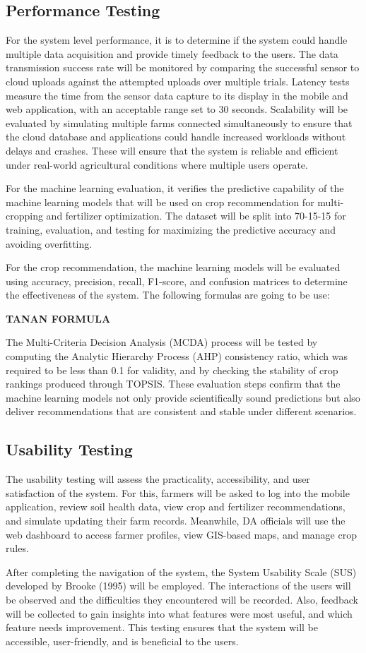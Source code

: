 {	\subsection{Performance Testing}
	For the system level performance, it is to determine if the system could handle multiple data acquisition and provide timely feedback to the users. The data transmission success rate will be monitored by comparing the successful sensor to cloud uploads against the attempted uploads over multiple trials. Latency tests measure the time from the sensor data capture to its display in the mobile and web application, with an acceptable range set to 30 seconds. Scalability will be evaluated by simulating multiple farms connected simultaneously to ensure that the cloud database and applications could handle increased workloads without delays and crashes. These will ensure that the system is reliable and efficient under real-world agricultural conditions where multiple users operate.
	
	For the machine learning evaluation, it verifies the predictive capability of the machine learning models that will be used on crop recommendation for multi-cropping and fertilizer optimization. The dataset will be split into 70-15-15 for training, evaluation, and testing for maximizing the predictive accuracy and avoiding overfitting. 
	
	For the crop recommendation, the machine learning models will be evaluated using accuracy, precision, recall, F1-score, and confusion matrices to determine the effectiveness of the system. The following formulas are going to be use:
	
	\textbf{TANAN FORMULA}
	
	The Multi-Criteria Decision Analysis (MCDA) process will be tested by computing the Analytic Hierarchy Process (AHP) consistency ratio, which was required to be less than 0.1 for validity, and by checking the stability of crop rankings produced through TOPSIS. These evaluation steps confirm that the machine learning models not only provide scientifically sound predictions but also deliver recommendations that are consistent and stable under different scenarios.
	
	\subsection{Usability Testing}
	The usability testing will assess the practicality, accessibility, and user satisfaction of the system. For this, farmers will be asked to log into the mobile application, review soil health data, view crop and fertilizer recommendations, and simulate updating their farm records. Meanwhile, DA officials will use the web dashboard to access farmer profiles, view GIS-based maps, and manage crop rules.
	
	After completing the navigation of the system, the System Usability Scale (SUS) developed by Brooke (1995) will be employed. The interactions of the users will be observed and the difficulties they encountered will be recorded. Also, feedback will be collected to gain insights into what features were most useful, and which feature needs improvement. This testing ensures that the system will be accessible, user-friendly, and is beneficial to the users.
	
}
